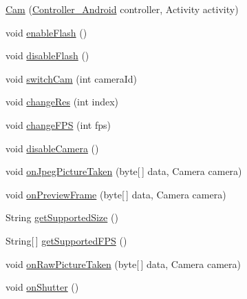 \begin{DoxyCompactItemize}
\item 
\hyperlink{classswp_1_1tuilmenau_1_1carduinodroid_1_1controller_1_1_cam_a8d39103ae69c076073e36459435c3e6b}{Cam} (\hyperlink{classswp_1_1tuilmenau_1_1carduinodroid_1_1controller_1_1_controller___android}{Controller\+\_\+\+Android} controller, Activity activity)
\item 
void \hyperlink{classswp_1_1tuilmenau_1_1carduinodroid_1_1controller_1_1_cam_a52096c4e16807a5338877c2249bfead5}{enable\+Flash} ()
\item 
void \hyperlink{classswp_1_1tuilmenau_1_1carduinodroid_1_1controller_1_1_cam_a043a28dda760fb66a89c670d97e70e60}{disable\+Flash} ()
\item 
void \hyperlink{classswp_1_1tuilmenau_1_1carduinodroid_1_1controller_1_1_cam_a7550a372448fb220d685acee511882f3}{switch\+Cam} (int camera\+Id)
\item 
void \hyperlink{classswp_1_1tuilmenau_1_1carduinodroid_1_1controller_1_1_cam_a14be40feed14460ce45a254bb9d5573d}{change\+Res} (int index)
\item 
void \hyperlink{classswp_1_1tuilmenau_1_1carduinodroid_1_1controller_1_1_cam_a935021c173d3d0a4e9d9cf1f0fc9253a}{change\+F\+P\+S} (int fps)
\item 
void \hyperlink{classswp_1_1tuilmenau_1_1carduinodroid_1_1controller_1_1_cam_a31a9a63c265425f1917dea93e722e49f}{disable\+Camera} ()
\item 
void \hyperlink{classswp_1_1tuilmenau_1_1carduinodroid_1_1controller_1_1_cam_a9d02cf28701a301ae81da9d826b6c6d6}{on\+Jpeg\+Picture\+Taken} (byte\mbox{[}$\,$\mbox{]} data, Camera camera)
\item 
void \hyperlink{classswp_1_1tuilmenau_1_1carduinodroid_1_1controller_1_1_cam_a36c84a09cf6164b9e80426a61a5ec860}{on\+Preview\+Frame} (byte\mbox{[}$\,$\mbox{]} data, Camera camera)
\item 
String \hyperlink{classswp_1_1tuilmenau_1_1carduinodroid_1_1controller_1_1_cam_aaea0b22ca98286ebc752799baf919457}{get\+Supported\+Size} ()
\item 
String\mbox{[}$\,$\mbox{]} \hyperlink{classswp_1_1tuilmenau_1_1carduinodroid_1_1controller_1_1_cam_ab293c9b431dc51ea0e16584720375473}{get\+Supported\+F\+P\+S} ()
\item 
void \hyperlink{classswp_1_1tuilmenau_1_1carduinodroid_1_1controller_1_1_cam_a356797b49cf972aa95148c88702cf81a}{on\+Raw\+Picture\+Taken} (byte\mbox{[}$\,$\mbox{]} data, Camera camera)
\item 
void \hyperlink{classswp_1_1tuilmenau_1_1carduinodroid_1_1controller_1_1_cam_aef536a7a7774a554aff67f70c5edd1de}{on\+Shutter} ()

\end{DoxyCompactItemize}
